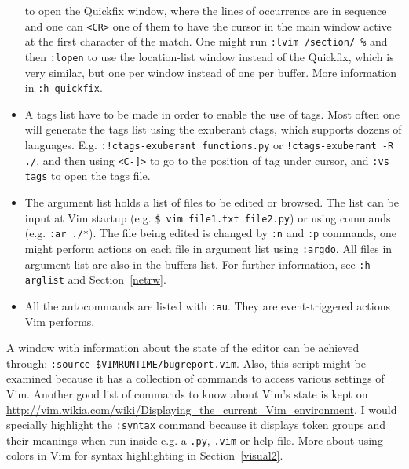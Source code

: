 \documentclass{article}
\newcommand{\ttt}[1] {
	\texttt{<#1>}}
\newcommand{\tttt}[1]{\texttt{#1}}
\begin{document}
\begin{itemize}
		to open the Quickfix window, where the lines of occurrence are in sequence
		and one can \ttt{CR} one of them to have the cursor in the main window active at
		the first character of the match.
		One might run \tttt{:lvim /section/ \%} and then \tttt{:lopen}
		to use the location-list window instead of the Quickfix, which
		is very similar, but one per window instead of one per buffer.
		More information in \tttt{:h quickfix}.
	\item A tags list have to be made in order to enable the use of tags.
		Most often one will generate the tags list using the exuberant ctags,
		which supports dozens of languages.
		E.g. \tttt{:!ctags-exuberant functions.py} or \tttt{!ctags-exuberant -R ./},
		and then using \ttt{C-]} to
		go to the position of tag under cursor, and \tttt{:vs tags} to open
		the tags file.
	\item The argument list holds a list of files to be edited or browsed. 
		The list can be input at Vim startup (e.g. \tttt{\$ vim file1.txt file2.py})
	or using commands (e.g. \tttt{:ar ./*}).
		The file being edited is changed by \tttt{:n} and \tttt{:p} commands,
		one might perform actions on each file in argument list using \tttt{:argdo}.
		All files in argument list are also in the buffers list.
    For further information, see \tttt{:h arglist} and Section~\ref{netrw}.
  \item All the autocommands are listed with \tttt{:au}.
    They are event-triggered actions Vim performs.
\end{itemize}

A window with information about the state of the editor
can be achieved through: \tttt{:source \$VIMRUNTIME/bugreport.vim}.
Also, this script might be examined because it has
a collection of commands to access various settings of Vim.
Another good list of commands to know about Vim's state is kept on
\url{http://vim.wikia.com/wiki/Displaying_the_current_Vim_environment}.
I would specially highlight the \tttt{:syntax} command because
it displays token groups and their meanings when run
inside e.g. a \tttt{.py}, \tttt{.vim} or help file.
More about using colors in Vim for syntax highlighting in Section~\ref{visual2}.
\end{document}
